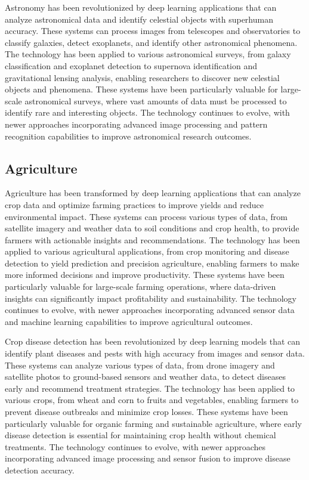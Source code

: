 Astronomy has been revolutionized by deep learning applications that can analyze astronomical data and identify celestial objects with superhuman accuracy. These systems can process images from telescopes and observatories to classify galaxies, detect exoplanets, and identify other astronomical phenomena. The technology has been applied to various astronomical surveys, from galaxy classification and exoplanet detection to supernova identification and gravitational lensing analysis, enabling researchers to discover new celestial objects and phenomena. These systems have been particularly valuable for large-scale astronomical surveys, where vast amounts of data must be processed to identify rare and interesting objects. The technology continues to evolve, with newer approaches incorporating advanced image processing and pattern recognition capabilities to improve astronomical research outcomes.

\subsection{Agriculture}

Agriculture has been transformed by deep learning applications that can analyze crop data and optimize farming practices to improve yields and reduce environmental impact. These systems can process various types of data, from satellite imagery and weather data to soil conditions and crop health, to provide farmers with actionable insights and recommendations. The technology has been applied to various agricultural applications, from crop monitoring and disease detection to yield prediction and precision agriculture, enabling farmers to make more informed decisions and improve productivity. These systems have been particularly valuable for large-scale farming operations, where data-driven insights can significantly impact profitability and sustainability. The technology continues to evolve, with newer approaches incorporating advanced sensor data and machine learning capabilities to improve agricultural outcomes.

Crop disease detection has been revolutionized by deep learning models that can identify plant diseases and pests with high accuracy from images and sensor data. These systems can analyze various types of data, from drone imagery and satellite photos to ground-based sensors and weather data, to detect diseases early and recommend treatment strategies. The technology has been applied to various crops, from wheat and corn to fruits and vegetables, enabling farmers to prevent disease outbreaks and minimize crop losses. These systems have been particularly valuable for organic farming and sustainable agriculture, where early disease detection is essential for maintaining crop health without chemical treatments. The technology continues to evolve, with newer approaches incorporating advanced image processing and sensor fusion to improve disease detection accuracy.

